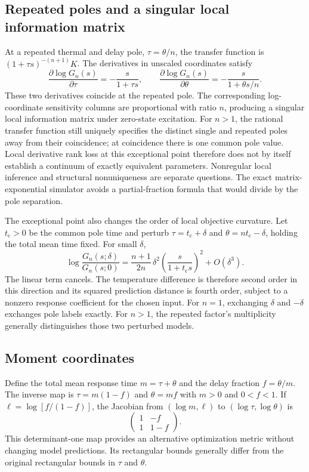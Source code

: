 \subsection{Repeated poles and a singular local information matrix}
At a repeated thermal and delay pole, $\tau=\theta/n$, the transfer function
is $(1+\tau s)^{-(n+1)}K$. The derivatives in unscaled coordinates satisfy
\[
 \frac{\partial\log G_n(s)}{\partial\tau}
 =-\frac{s}{1+\tau s},\qquad
 \frac{\partial\log G_n(s)}{\partial\theta}
 =-\frac{s}{1+\theta s/n}.
\]
These two derivatives coincide at the repeated pole. The corresponding
log-coordinate sensitivity columns are proportional with ratio $n$, producing
a singular local information matrix under zero-state excitation.
For $n>1$, the rational transfer function still uniquely specifies the distinct
single and repeated poles away from their coincidence; at coincidence there is
one common pole value. Local derivative rank loss at this exceptional point
therefore does not by itself establish a continuum of exactly equivalent
parameters. Nonregular local inference and structural nonuniqueness are separate
questions. The exact matrix-exponential simulator avoids a partial-fraction
formula that would divide by the pole separation.

The exceptional point also changes the order of local objective curvature.
Let $t_{\mathrm c}>0$ be the common pole time and perturb
$\tau=t_{\mathrm c}+\delta$ and $\theta=nt_{\mathrm c}-\delta$, holding the
total mean time fixed. For small $\delta$,
\[
 \log\frac{G_n(s;\delta)}{G_n(s;0)}
 =\frac{n+1}{2n}\,\delta^2
   \left(\frac{s}{1+t_{\mathrm c}s}\right)^2+O(\delta^3).
\]
The linear term cancels. The temperature difference is therefore second order
in this direction and its squared prediction distance is fourth order, subject
to a nonzero response coefficient for the chosen input. For $n=1$, exchanging
$\delta$ and $-\delta$ exchanges pole labels exactly. For $n>1$, the repeated
factor's multiplicity generally distinguishes those two perturbed models.

\subsection{Moment coordinates}
Define the total mean response time $m=\tau+\theta$ and the delay fraction
$f=\theta/m$. The inverse map is $\tau=m(1-f)$ and $\theta=mf$ with
$m>0$ and $0<f<1$. If $\ell=\log[f/(1-f)]$, the Jacobian from
$(\log m,\ell)$ to $(\log\tau,\log\theta)$ is
\[
 \begin{pmatrix}1&-f\\1&1-f\end{pmatrix}.
\]
This determinant-one map provides an alternative optimization metric without
changing model predictions. Its rectangular bounds generally differ from the
original rectangular bounds in $\tau$ and $\theta$.

